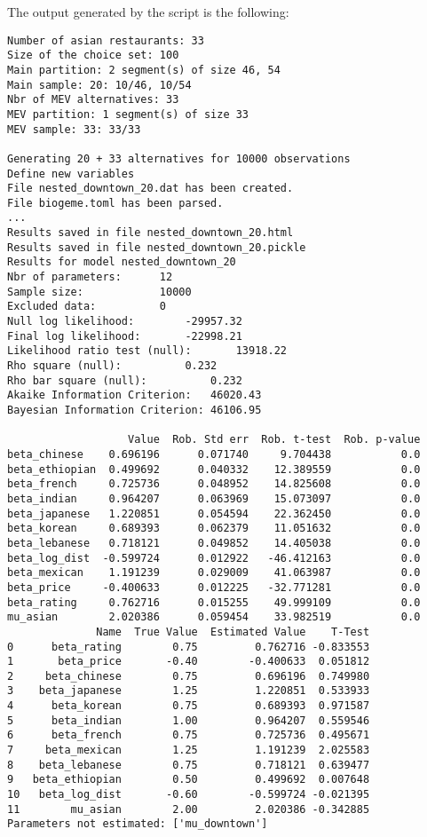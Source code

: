 \documentclass[12pt,a4paper]{article}
\begin{document}
The output generated by the script is the following:
\begin{lstlisting}
Number of asian restaurants: 33
Size of the choice set: 100
Main partition: 2 segment(s) of size 46, 54
Main sample: 20: 10/46, 10/54
Nbr of MEV alternatives: 33
MEV partition: 1 segment(s) of size 33
MEV sample: 33: 33/33

Generating 20 + 33 alternatives for 10000 observations
Define new variables
File nested_downtown_20.dat has been created.
File biogeme.toml has been parsed.
...
Results saved in file nested_downtown_20.html
Results saved in file nested_downtown_20.pickle
Results for model nested_downtown_20
Nbr of parameters:		12
Sample size:			10000
Excluded data:			0
Null log likelihood:		-29957.32
Final log likelihood:		-22998.21
Likelihood ratio test (null):		13918.22
Rho square (null):			0.232
Rho bar square (null):			0.232
Akaike Information Criterion:	46020.43
Bayesian Information Criterion:	46106.95

                   Value  Rob. Std err  Rob. t-test  Rob. p-value
beta_chinese    0.696196      0.071740     9.704438           0.0
beta_ethiopian  0.499692      0.040332    12.389559           0.0
beta_french     0.725736      0.048952    14.825608           0.0
beta_indian     0.964207      0.063969    15.073097           0.0
beta_japanese   1.220851      0.054594    22.362450           0.0
beta_korean     0.689393      0.062379    11.051632           0.0
beta_lebanese   0.718121      0.049852    14.405038           0.0
beta_log_dist  -0.599724      0.012922   -46.412163           0.0
beta_mexican    1.191239      0.029009    41.063987           0.0
beta_price     -0.400633      0.012225   -32.771281           0.0
beta_rating     0.762716      0.015255    49.999109           0.0
mu_asian        2.020386      0.059454    33.982519           0.0
              Name  True Value  Estimated Value    T-Test
0      beta_rating        0.75         0.762716 -0.833553
1       beta_price       -0.40        -0.400633  0.051812
2     beta_chinese        0.75         0.696196  0.749980
3    beta_japanese        1.25         1.220851  0.533933
4      beta_korean        0.75         0.689393  0.971587
5      beta_indian        1.00         0.964207  0.559546
6      beta_french        0.75         0.725736  0.495671
7     beta_mexican        1.25         1.191239  2.025583
8    beta_lebanese        0.75         0.718121  0.639477
9   beta_ethiopian        0.50         0.499692  0.007648
10   beta_log_dist       -0.60        -0.599724 -0.021395
11        mu_asian        2.00         2.020386 -0.342885
Parameters not estimated: ['mu_downtown']
\end{lstlisting}
\end{document}
